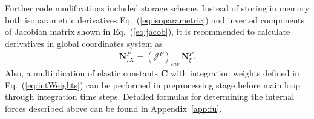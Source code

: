 Further code modifications included storage scheme.
Instead of storing in memory both isoparametric derivatives Eq.~(\ref{eq:isoparametric}) and inverted components of Jacobian matrix shown in Eq.~(\ref{eq:jacob}), it is recommended to calculate derivatives in global coordinates system as
\begin{eqnarray}
	\textbf{N}^P_{,X} = \left(\mathcal{J}^P\right)_{inv}\,\textbf{N}^P_{\xi}.
\end{eqnarray}
Also, a multiplication of elastic constants \(\textbf{C}\) with integration weights defined in Eq.~(\ref{eq:intWeights}) can be performed in preprocessing stage before main loop through integration time steps.
Detailed formulas for determining the internal forces described above can be found in Appendix~\ref{app:fu}.

